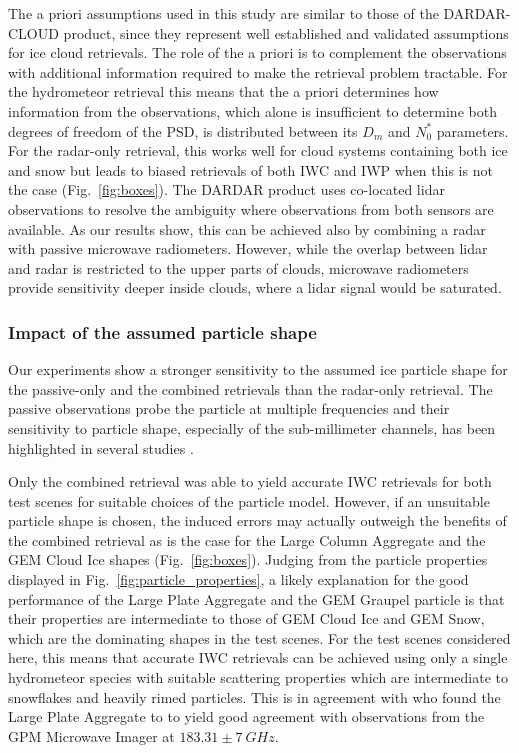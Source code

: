 \documentclass[journal abbreviation, manuscript]{copernicus}
\begin{document}
The a priori assumptions used in this study are similar to those of the
DARDAR-CLOUD product, since they represent well established and validated
assumptions for ice cloud retrievals. The role of the a priori is to complement
the observations with additional information required to make the retrieval
problem tractable. For the hydrometeor retrieval this means that the a priori
determines how information from the observations, which alone is insufficient to
determine both degrees of freedom of the PSD, is distributed between its $D_m$
and $N_0^*$ parameters. For the radar-only retrieval, this works well for cloud
systems containing both ice and snow but leads to biased retrievals of both IWC
and IWP when this is not the case (Fig.~\ref{fig:boxes}). The DARDAR product
uses co-located lidar observations to resolve the ambiguity where observations
from both sensors are available. As our results show, this can be achieved also
by combining a radar with passive microwave radiometers. However, while the
overlap between lidar and radar is restricted to the upper parts of clouds,
microwave radiometers provide sensitivity deeper inside clouds, where a lidar
signal would be saturated.


\subsubsection{Impact of the assumed particle shape}

Our experiments show a stronger sensitivity to the assumed ice particle shape
for the passive-only and the combined retrievals than the radar-only retrieval.
The passive observations probe the particle at multiple frequencies and their
sensitivity to particle shape, especially of the sub-millimeter channels, has
been highlighted in several studies \citep{ekelund20, fox19}.

Only the combined retrieval was able to yield accurate IWC retrievals for both
test scenes for suitable choices of the particle model. However, if an
unsuitable particle shape is chosen, the induced errors may actually outweigh
the benefits of the combined retrieval as is the case for the Large Column
Aggregate and the GEM Cloud Ice shapes (Fig.~\ref{fig:boxes}). Judging from the
particle properties displayed in Fig.~\ref{fig:particle_properties}, a likely
explanation for the good performance of the Large Plate Aggregate and the GEM
Graupel particle is that their properties are intermediate to those of GEM Cloud
Ice and GEM Snow, which are the dominating shapes in the test scenes. For the
test scenes considered here, this means that accurate IWC retrievals can be
achieved using only a single hydrometeor species with suitable scattering
properties which are intermediate to snowflakes and heavily rimed particles.
This is in agreement with \citet{ekelund20} who found the Large Plate Aggregate
to to yield good agreement with observations from the GPM Microwave Imager at
$183.31 \pm 7\ \unit{GHz}$.
\end{document}
